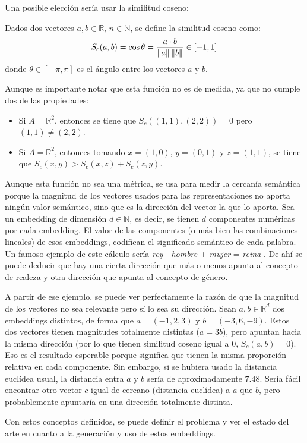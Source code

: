Una posible elección sería usar la similitud coseno:

\begin{definition}
  Dados dos vectores $a,b\in\mathbb{R}$, $n\in\mathbb{N}$, se define la similitud coseno como:
  \[
    S_c(a,b)=\cos\theta = \frac{a\cdot b}{\left\lVert a\right\rVert\left\lVert b\right\rVert} \in [-1, 1]
  \]
donde $\theta\in[-\pi,\pi]$ es el ángulo entre los vectores $a$ y $b$.
\end{definition}

Aunque es importante notar que esta función no es de medida, ya que no cumple dos de las propiedades:
\begin{itemize}
    \item Si $A=\mathbb{R}^2$, entonces se tiene que $S_c\left( (1,1), (2,2) \right) = 0$ pero $(1,1)\neq (2,2)$.
    \item Si $A=\mathbb{R}^2$, entonces tomando $x=(1,0)$, $y=(0,1)$ y $z=(1,1)$, se tiene que $S_c\left( x, y \right) > S_c(x,z) + S_c(z,y)$.
\end{itemize}

Aunque esta función no sea una métrica, se usa para medir la cercanía semántica porque la magnitud de los vectores usados para las representaciones no aporta
ningún valor semántico, sino que es la dirección del vector la que lo aporta. Sea un embedding de dimensión $d\in\mathbb{N}$, es decir,
se tienen $d$ componentes numéricas por cada embedding. El valor de las componentes (o más bien las combinaciones lineales) de esos embeddings,
codifican el significado semántico de cada palabra. Un famoso ejemplo de este cálculo sería \emph{rey} - \emph{hombre} + \emph{mujer} = \emph{reina} \cite{drozd-etal-2016-word}.
De ahí se puede deducir que hay una cierta dirección que más o menos apunta al concepto de realeza y otra dirección que apunta al concepto de género.

A partir de ese ejemplo, se puede ver perfectamente la razón de que la magnitud de los vectores no sea relevante pero sí lo sea su dirección. Sean $a,b\in\mathbb{R}^d$ dos embeddings
distintos, de forma que $a=(-1, 2, 3)$ y $b=(-3, 6, -9)$. Estos dos vectores tienen magnitudes totalmente distintas ($a=3b$), pero apuntan hacia la misma dirección
(por lo que tienen similitud coseno igual a 0, $S_c(a,b)=0$). Eso es el resultado esperable porque significa que tienen la misma proporción relativa en cada componente.
Sin embargo, si se hubiera usado la distancia euclídea usual, la distancia entra $a$ y $b$ sería de aproximadamente $7.48$. Sería fácil encontrar otro vector $c$ igual de cercano (distancia euclídea) a $a$
que $b$, pero probablemente apuntaría en una dirección totalmente distinta.

Con estos conceptos definidos, se puede definir el problema y ver el estado del arte en cuanto a la generación y uso de estos embeddings.